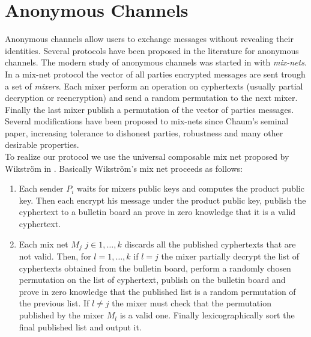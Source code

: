 \documentclass{acm_proc_article-sp}
\begin{document}
\section{Anonymous Channels} \label{sect:AC}
Anonymous channels allow users to exchange messages without revealing their identities. Several protocols
have been proposed in the literature for anonymous channels. The modern study of anonymous channels was
started in \cite{journals/cacm/Chaum81} with \textit{mix-nets}. In a mix-net protocol the vector of all
parties encrypted messages are sent trough a set of \textit{mixers}. Each mixer perform an operation on cyphertexts
(usually partial decryption or reencryption) and send a random permutation to the next mixer. Finally the
last mixer publish a permutation of the vector of parties messages. Several modifications have been proposed
to mix-nets since Chaum's seminal paper, increasing tolerance to dishonest parties, robustness and many other
desirable properties.\\
To realize our protocol we use the universal composable mix net proposed by Wikstr\"om in \cite{Wikstrom04a}.
Basically Wikstr\"om's mix net proceeds as follows:

\begin{enumerate}

\item Each sender $P_i$ waits for mixers public keys and computes the product public key.
      Then each encrypt his message under the product public key, publish the cyphertext
      to a bulletin board an prove in zero knowledge that it is a valid cyphertext.
\item Each mix net $M_j$ $j\in{1, \ldots, k}$ discards all the published cyphertexts that
      are not valid. Then, for $l = 1, \ldots, k$ if $l = j$ the mixer partially decrypt
      the list of cyphertexts obtained from the bulletin board, perform a randomly chosen
      permutation on the list of cyphertext, publish on the bulletin board and prove in
      zero knowledge that the published list is a random permutation of the previous list.
      If $l \neq j$ the mixer must check that the permutation published by the mixer $M_l$
      is a valid one. Finally lexicographically sort the final published list and output it.

\end{enumerate}
\end{document}

